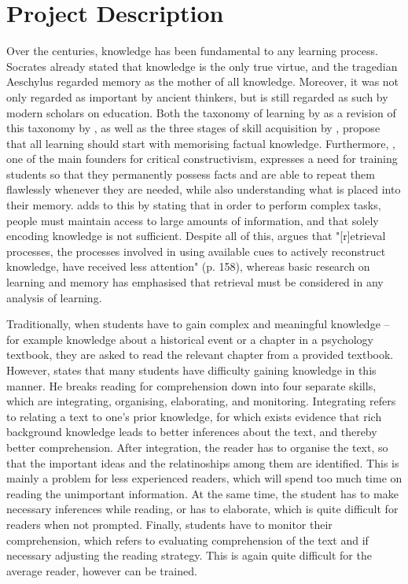 \chapter{Project Description}

\label{ch:problem}

Over the centuries, knowledge has been fundamental to any learning process. Socrates already stated that knowledge is the only true virtue, and the tragedian Aeschylus regarded memory as the mother of all knowledge. Moreover, it was not only regarded as important by ancient thinkers, but is still regarded as such by modern scholars on education. Both the taxonomy of learning by  as a revision of this taxonomy by , as well as the three stages of skill acquisition by , propose that all learning should start with memorising factual knowledge. Furthermore, , one of the main founders for critical constructivism, expresses a need for training students so that they permanently possess facts and are able to repeat them flawlessly whenever they are needed, while also understanding what is placed into their memory.  adds to this by stating that in order to perform complex tasks, people must maintain access to large amounts of information, and that solely encoding knowledge is not sufficient. Despite all of this,  argues that "[r]etrieval processes, the processes involved in using available cues to actively reconstruct knowledge, have received less attention" (p. 158), whereas basic research on learning and memory has emphasised that retrieval must be considered in any analysis of learning.

Traditionally, when students have to gain complex and meaningful knowledge -- for example knowledge about a historical event or a chapter in a psychology textbook, they are asked to read the relevant chapter from a provided textbook. However,  states that many students have difficulty gaining knowledge in this manner. He breaks reading for comprehension down into four separate skills, which are integrating, organising, elaborating, and monitoring. Integrating refers to relating a text to one's prior knowledge, for which exists evidence that rich background knowledge leads to better inferences about the text, and thereby better comprehension. After integration, the reader has to organise the text, so that the important ideas and the relatinoships among them are identified. This is mainly a problem for less experienced readers, which will spend too much time on reading the unimportant information. At the same time, the student has to make necessary inferences while reading, or has to elaborate, which is quite difficult for readers when not prompted. Finally, students have to monitor their comprehension, which refers to evaluating comprehension of the text and if necessary adjusting the reading strategy. This is again quite difficult for the average reader, however can be trained.


